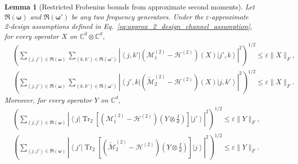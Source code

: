 \documentclass[%
 reprint,
 amsmath,amssymb,
 aps,
 pra,
]{revtex4-2}
\newtheorem{lemma}[theorem]{Lemma}
\theoremstyle{definition}
\begin{document}
\begin{lemma}[Restricted Frobenius bounds from approximate second moments]
\label{lemma:restricted_frobenius_from_design}
Let $\mathfrak R(\bm{\omega})$ and $\mathfrak R(\bm{\omega}')$ be any two frequency generators. Under the $\varepsilon$-approximate 2-design assumptions defined in Eq.~\eqref{eq:approx_2_design_channel_assumption}, for every operator $X$ on $\mathbb C^d\otimes\mathbb C^d$,
\begin{align}
&
\left(
\sum_{(j,j')\in\mathfrak R(\bm{\omega})}
\sum_{(k,k')\in\mathfrak R(\bm{\omega}')}
\left|
\left\langle j,k'\right|
\left(
\mathcal M^{(2)}_1-\mathcal H^{(2)}
\right)(X)
\left|j',k\right\rangle
\right|^2
\right)^{1/2}
\leq
\varepsilon\|X\|_F,
\label{eq:restricted_bound_M1}
\\
&
\left(
\sum_{(j,j')\in\mathfrak R(\bm{\omega})}
\sum_{(k,k')\in\mathfrak R(\bm{\omega}')}
\left|
\left\langle j',k\right|
\left(
\widetilde{\mathcal M}^{(2)}_2-\mathcal H^{(2)}
\right)(X)
\left|j,k'\right\rangle
\right|^2
\right)^{1/2}
\leq
\varepsilon\|X\|_F.
\label{eq:restricted_bound_M2}
\end{align}
Moreover, for every operator $Y$ on $\mathbb C^d$,
\begin{align}
&
\left(
\sum_{(j,j')\in\mathfrak R(\bm{\omega})}
\left|
\left\langle j\right|
\operatorname{Tr}_2
\left[
\left(
\mathcal M^{(2)}_1-\mathcal H^{(2)}
\right)
\left(
Y\otimes\frac{I}{d}
\right)
\right]
\left|j'\right\rangle
\right|^2
\right)^{1/2}
\leq
\varepsilon\|Y\|_F,
\label{eq:partial_trace_bound_M1}
\\
&
\left(
\sum_{(j,j')\in\mathfrak R(\bm{\omega})}
\left|
\left\langle j'\right|
\operatorname{Tr}_2
\left[
\left(
\widetilde{\mathcal M}^{(2)}_2-\mathcal H^{(2)}
\right)
\left(
Y\otimes\frac{I}{d}
\right)
\right]
\left|j\right\rangle
\right|^2
\right)^{1/2}
\leq
\varepsilon\|Y\|_F.
\label{eq:partial_trace_bound_M2}
\end{align}
\end{lemma}
\end{document}
